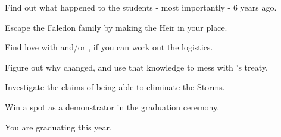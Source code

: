 \documentclass[char]{GL2020}
\begin{document}





\begin{itemz}[Goals]
\item Find out what happened to the students - most importantly \cHeirSibling{} - 6 years ago.
\item Escape the Faledon family by making \cAmbition{} the Heir in your place.
\item Find love with \cChupStudent{} and/or \cPresident{}, if you can work out the logistics.
\item Figure out why \cLoud{} changed, and use that knowledge to mess with \cDiplomat{}’s treaty.
\item Investigate the claims of being able to eliminate the Storms.
\item Win a spot as a demonstrator in the graduation ceremony.
\end{itemz}

\begin{itemz}[Notes]
	\item You are graduating this year.
\end{itemz}
\end{document}
